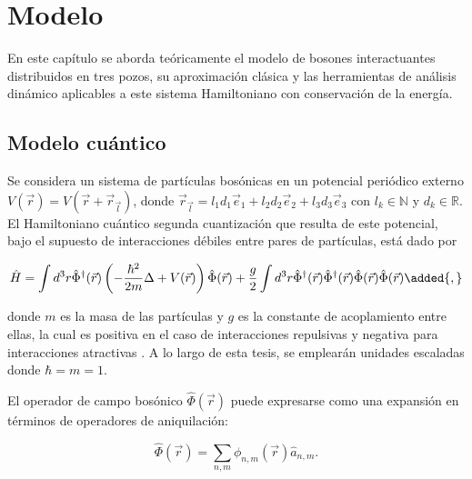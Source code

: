 

\chapter{Modelo}

En este capítulo se aborda teóricamente el modelo de bosones interactuantes
distribuidos en tres pozos, su aproximación clásica y las herramientas de
análisis dinámico aplicables a este sistema Hamiltoniano con conservación
de la energía.

\section{Modelo cuántico}

Se considera un sistema de partículas bosónicas en un potencial periódico
externo $ V(\vec{r}) = V(\vec{r} + \vec{r}_{\vec{l}}) $, donde $ \vec{r}_{\vec{l}}
    = l_{1}d_{1}\vec{e}_{1} + l_{2}d_{2}\vec{e}_{2} + l_{3}d_{3}\vec{e}_{3} $ con
$ l_{k} \in \mathbb{N} $ y $ d_{k} \in \mathbb{R} $.
El Hamiltoniano cuántico  segunda cuantización que resulta de este potencial,
bajo el supuesto de interacciones débiles entre pares de partículas, está dado
por 

\begin{equation}
    \hat{H} = \int d^{3}r \hat{\Phi}^{\dagger}(\vec{r}) \left( -\frac{\hbar^{2}}{2m}
    \Delta + V(\vec{r}) \right) \hat{\Phi}(\vec{r})
    + \frac{g}{2} \int d^{3}r \hat{\Phi}^{\dagger}(\vec{r}) \hat{\Phi}^{\dagger}(\vec{r})
    \hat{\Phi}(\vec{r}) \hat{\Phi}(\vec{r})\added{,}
    \label{eq:hamiltonianbase}
\end{equation}

\noindent donde $ m $ es la masa de las partículas y $ g $ es la constante de acoplamiento
entre ellas, la cual es positiva en el caso de interacciones repulsivas y negativa
para interacciones atractivas \cite{mossmann2006semiclassical}. A lo largo de esta tesis, se emplearán unidades
escaladas donde $\hbar = m = 1$.

El operador de campo bosónico $ \hat{\Phi}(\vec{r}) $ puede expresarse como una
expansión en términos de operadores de aniquilación:

\begin{equation}
    \hat{\Phi}(\vec{r}) = \sum_{n,m} \phi_{n,m}(\vec{r}) \hat{a}_{n,m}.
    \label{eq:field_expansion}
\end{equation}

